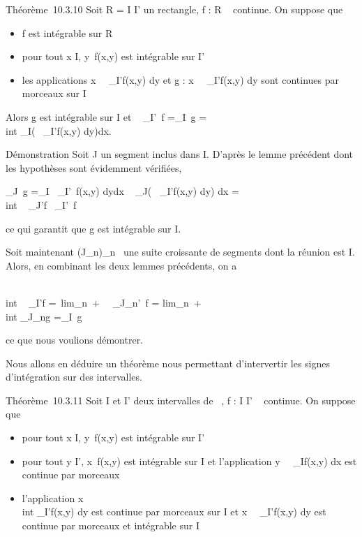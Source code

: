 \documentclass[]{article}
\begin{document}
Théorème~10.3.10 Soit R = I \times I' un rectangle, f : R \rightarrow~  continue. On
suppose que

\begin{itemize}
\itemsep1pt\parskip0pt
\item
  f est intégrable sur R
\item
  pour tout x \in I, y\mapsto~f(x,y) est intégrable
  sur I'
\item
  les applications
  x\mapsto~\int ~
  _I'f(x,y) dy et g :
  x\mapsto~\int ~
  _I'f(x,y) dy sont continues par morceaux sur I
\end{itemize}

Alors g est intégrable sur I et \int ~
\int  _I\timesI'~f
=\int  _I~g =\\int
 _I\left (\int ~
_I'f(x,y) dy\right )dx.

Démonstration Soit J un segment inclus dans I. D'après le lemme
précédent dont les hypothèses sont évidemment vérifiées,

\int  _J~g
=\int  _I~\left
\int  _I'~f(x,y)
dy\right  dx \leq\int ~
_J\left (\int ~
_I'f(x,y) dy\right ) dx
=\int  \\int ~
_J\timesI'f\leq\int ~
\int  _I\timesI'~f

ce qui garantit que g est intégrable sur I.

Soit maintenant (J_n)_n\in{}~ une suite croissante de
segments dont la réunion est I. Alors, en combinant les deux lemmes
précédents, on a

\int  \\int ~
_I\timesI'f =\
lim_n\rightarrow~+\infty~\int ~
\int  _J_n\timesI'~f
= lim_n\rightarrow~+\infty~~\\int
 _J_ng =\int  _I~g

ce que nous voulions démontrer.

Nous allons en déduire un théorème nous permettant d'intervertir les
signes d'intégration sur des intervalles.

Théorème~10.3.11 Soit I et I' deux intervalles de ~, f : I \times I' \rightarrow~ 
continue. On suppose que

\begin{itemize}
\itemsep1pt\parskip0pt
\item
  pour tout x \in I, y\mapsto~f(x,y) est intégrable
  sur I'
\item
  pour tout y \in I', x\mapsto~f(x,y) est intégrable
  sur I et l'application
  y\mapsto~\int ~
  _If(x,y) dx est continue par morceaux
\item
  l'application x\mapsto~\\int
   _I'f(x,y) dy est continue par morceaux sur I et
  x\mapsto~\int ~
  _I'f(x,y) dy est continue par morceaux et
  intégrable sur I
\end{itemize}
\end{document}
